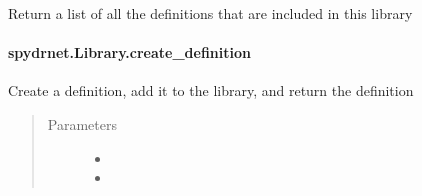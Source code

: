 \documentclass[letterpaper,10pt,english,openany,oneside]{sphinxmanual}
\begin{document}
\begin{fulllineitems}
\label{\detokenize{reference/classes/generated/spydrnet.Library.definitions:spydrnet.Library.definitions}}
Return a list of all the definitions that are included in this library

\end{fulllineitems}



\paragraph{spydrnet.Library.create\_definition}
\label{\detokenize{reference/classes/generated/spydrnet.Library.create_definition:spydrnet-library-create-definition}}\label{\detokenize{reference/classes/generated/spydrnet.Library.create_definition::doc}}

\begin{fulllineitems}
\label{\detokenize{reference/classes/generated/spydrnet.Library.create_definition:spydrnet.Library.create_definition}}
Create a definition, add it to the library, and return the definition
\begin{quote}\begin{description}
\item[{Parameters}] \leavevmode\begin{itemize}
\item {} 

\item {} 

\end{itemize}

\end{description}\end{quote}

\end{fulllineitems}
\end{document}
